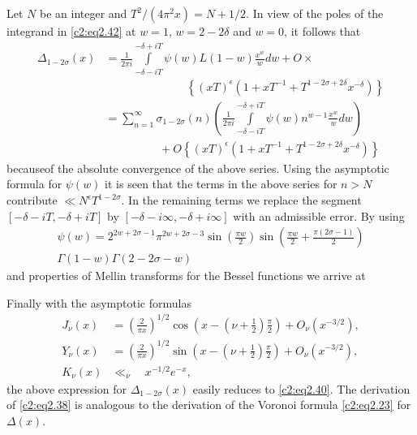 Let $N$ be an integer and $T^2/(4 \pi^2 x)= N+1/2$. In view of the
poles of the integrand in \eqref{c2:eq2.42} at $w=1$, $w=2-2\delta$
and $w=0$, it follows that
\begin{align*}
  \Delta _{1- 2 \sigma}(x) & = \frac{1}{2 \pi i} \int\limits_{-
    \delta - iT}^{-\delta + iT} \psi (w)L (1-w)\frac{x^w}{w} dw + O\times\\
  & \hspace{3cm}\left\{(x T)^\epsilon (1+ x T^{-1}+ T^{1- 2 \sigma + 2 \delta}
  x^{-\delta}) \right\}\\
  & = \sum_{n=1}^\infty \sigma_{1- 2 \sigma}(n) \left(\frac{1}{2 \pi
    i} \int\limits_{- \delta - i T}^{- \delta + i T} \psi (w)
  n^{w-1} \frac{x^w}{w} dw \right)\\
  & \hspace{2cm} + O \left\{(xT)^\epsilon (1+ x T^{-1} + T^{1- 2 \sigma
    + 2 \delta} x^{-\delta}) \right\}
\end{align*}
because\pageoriginale of the absolute convergence of the above series. Using the
asymptotic formula for $\psi (w)$ it is seen that the terms in the
above series for $n > N$ contribute $\ll N^\epsilon T^{1- 2
  \sigma}$. In the remaining terms we replace the segment $[- \delta -
i T, - \delta + i T]$ by $[- \delta - i \infty, - \delta + i \infty]$
with an admissible error. By using
\begin{multline*}
\psi (w)= 2^{2w + 2 \sigma -1} \pi^{2w + 2 \sigma -3} \sin
\left(\frac{\pi w}{2} \right) \sin \left(\frac{\pi w}{2} + \frac{\pi
  (2 \sigma -1)}{2} \right)\\ 
\Gamma (1-w) \Gamma (2- 2 \sigma -w)
\end{multline*}
and properties of Mellin transforms for the Bessel functions we arrive
at
{}

Finally with the asymptotic formulas
\begin{align*}
  J_\nu (x) & = \left(\frac{2}{\pi x} \right)^{1/2} \cos \left(x -\left(\nu +
  \frac{1}{2}\right) \frac{\pi}{2}\right) + O_\nu (x^{-3/2}),\\
  Y_\nu (x) & = \left(\frac{2}{\pi x} \right)^{1/2} \sin\left(x-
  \left(\nu + \frac{1}{2} \right) \frac{\pi}{2}\right) + O_\nu (x^{-
    3/2}),\\
  K_\nu (x) & \ll_\nu \quad x^{-1/2} e^{-x},
\end{align*}
the above expression for $\Delta _{1-2 \sigma} (x)$ easily reduces
to \eqref{c2:eq2.40}. The derivation of \eqref{c2:eq2.38} is analogous
to the derivation of the Voronoi formula \eqref{c2:eq2.23} for
$\Delta  (x)$.

